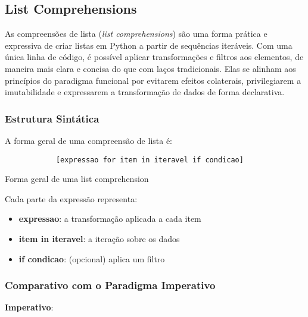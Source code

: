 \documentclass[date,twocolumn,a4paper]{ppgem}
\begin{document}
    \subsection{List Comprehensions}
    As compreensões de lista (\textit{list comprehensions}) são uma forma prática e expressiva de criar listas em Python a partir de sequências iteráveis. Com uma única linha de código, é possível aplicar transformações e filtros aos elementos, de maneira mais clara e concisa do que com laços tradicionais. Elas se alinham aos princípios do paradigma funcional por evitarem efeitos colaterais, privilegiarem a imutabilidade e expressarem a transformação de dados de forma declarativa.

    \subsubsection{Estrutura Sintática}
    A forma geral de uma compreensão de lista é:

    \begin{listing}[!ht]
        \begin{verbatim}
            [expressao for item in iteravel if condicao]
        \end{verbatim}
        \caption{Forma geral de uma list comprehension}
        \label{listing:2}
    \end{listing}

    Cada parte da expressão representa:
    \begin{itemize}
        \item \textbf{expressao}: a transformação aplicada a cada item
        \item \textbf{item in iteravel}: a iteração sobre os dados
        \item \textbf{if condicao}: (opcional) aplica um filtro
    \end{itemize}

    \subsubsection{Comparativo com o Paradigma Imperativo}
    \textbf{Imperativo}:
\end{document}
